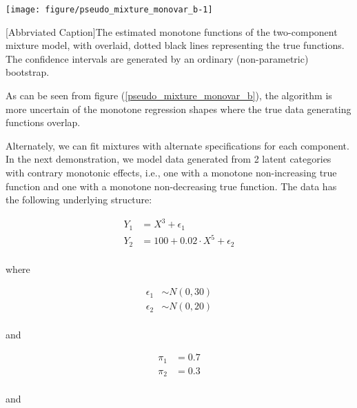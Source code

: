 \documentclass[fleqn,10pt]{olplainarticle}\usepackage[]{graphicx}\usepackage[]{color}
\makeatletter
\def\maxwidth{ %
  \ifdim\Gin@nat@width>\linewidth
    \linewidth
  \else
    \Gin@nat@width
  \fi
}
\newenvironment{knitrout}{}{} %
\makeatother
\begin{document}
\begin{minipage}{0.8\textwidth} 
\begin{knitrout}
\color{fgcolor}

{\centering \texttt{[image: figure/pseudo\_mixture\_monovar\_b-1]} 

}



\end{knitrout}
[Abbrviated Caption]{The estimated monotone functions of the two-component mixture model, with overlaid, dotted black lines representing the true functions. The confidence intervals are generated by an ordinary (non-parametric) bootstrap.}
\end{minipage}

As can be seen from figure (\ref{pseudo_mixture_monovar_b}), the algorithm is more uncertain of the monotone regression shapes where the true data generating functions overlap. 


Alternately, we can fit mixtures with alternate specifications for each component. In the next demonstration, we model data generated from 2 latent categories with contrary monotonic effects, i.e., one with a monotone non-increasing true function and one with a monotone non-decreasing true function. The data has the following underlying structure:

\begin{align*}
  Y_{1} &= X^3 + \epsilon_1 \\
  Y_{2} &= 100 + 0.02 \cdot X^5 + \epsilon_2 \\
\end{align*}

where 

\begin{align*}
  \epsilon_1 &\sim N(0,30) \\
  \epsilon_2 &\sim N(0,20) \\
\end{align*}

and

\begin{align*}
  \pi_1 &= 0.7 \\
  \pi_2 &= 0.3 \\
\end{align*}

and
\end{document}
